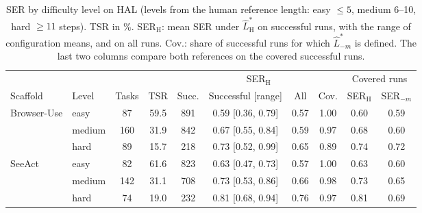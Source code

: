 \begin{table}[t]
\centering
\caption{SER by difficulty level on HAL (levels from the human reference length: easy $\le 5$, medium 6--10,
hard $\ge 11$ steps). TSR in \%. SER$_{\mathrm{H}}$: mean SER under $\hat L^{*}_{\mathrm{H}}$ on successful runs, with
the range of configuration means, and on all runs. Cov.: share of successful runs for which $\hat L^{*}_{-m}$ is
defined. The last two columns compare both references on the covered successful runs.}
\label{tab:strata}
\footnotesize
\setlength{\tabcolsep}{3pt}
\begin{tabular}{@{}llcccccccc@{}}
\toprule
& & & & & \multicolumn{2}{c}{SER$_{\mathrm{H}}$} & & \multicolumn{2}{c}{Covered runs} \\
\cmidrule(lr){6-7}\cmidrule(l){9-10}
Scaffold & Level & Tasks & TSR & Succ. & Successful [range] & All & Cov. & SER$_{\mathrm{H}}$ & SER$_{-m}$ \\
\midrule
Browser-Use & easy & 87 & 59.5 & 891 & 0.59 [0.36, 0.79] & 0.57 & 1.00 & 0.60 & 0.59 \\
 & medium & 160 & 31.9 & 842 & 0.67 [0.55, 0.84] & 0.59 & 0.97 & 0.68 & 0.60 \\
 & hard & 89 & 15.7 & 218 & 0.73 [0.52, 0.99] & 0.65 & 0.89 & 0.74 & 0.72 \\
SeeAct & easy & 82 & 61.6 & 823 & 0.63 [0.47, 0.73] & 0.57 & 1.00 & 0.63 & 0.60 \\
 & medium & 142 & 31.1 & 708 & 0.73 [0.53, 0.86] & 0.66 & 0.98 & 0.73 & 0.65 \\
 & hard & 74 & 19.0 & 232 & 0.81 [0.68, 0.94] & 0.76 & 0.97 & 0.81 & 0.69 \\
\bottomrule
\end{tabular}
\end{table}
